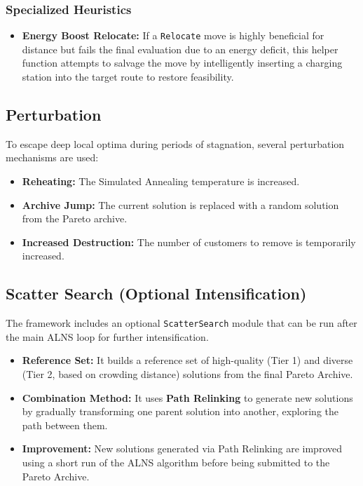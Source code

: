 \documentclass[a4paper,12pt]{article}
\begin{document}
\subsubsection{Specialized Heuristics}
\begin{itemize}
    \item \textbf{Energy Boost Relocate:} If a \texttt{Relocate} move is highly beneficial for distance but fails the final evaluation due to an energy deficit, this helper function attempts to salvage the move by intelligently inserting a charging station into the target route to restore feasibility.
\end{itemize}

\subsection{Perturbation}
To escape deep local optima during periods of stagnation, several perturbation mechanisms are used:
\begin{itemize}
    \item \textbf{Reheating:} The Simulated Annealing temperature is increased.
    \item \textbf{Archive Jump:} The current solution is replaced with a random solution from the Pareto archive.
    \item \textbf{Increased Destruction:} The number of customers to remove is temporarily increased.
\end{itemize}

\subsection{Scatter Search (Optional Intensification)}
The framework includes an optional \texttt{ScatterSearch} module that can be run after the main ALNS loop for further intensification.
\begin{itemize}
    \item \textbf{Reference Set:} It builds a reference set of high-quality (Tier 1) and diverse (Tier 2, based on crowding distance) solutions from the final Pareto Archive.
    \item \textbf{Combination Method:} It uses \textbf{Path Relinking} to generate new solutions by gradually transforming one parent solution into another, exploring the path between them.
    \item \textbf{Improvement:} New solutions generated via Path Relinking are improved using a short run of the ALNS algorithm before being submitted to the Pareto Archive.
\end{itemize}
\end{document}
